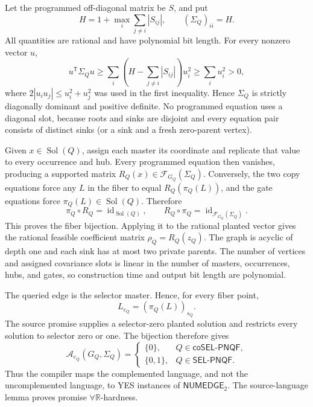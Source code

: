 Let the programmed off-diagonal matrix be \(S\), and put
\[
H=1+\max_i\sum_{j\ne i}|S_{ij}|,
\qquad (\Sigma_Q)_{ii}=H.
\]
All quantities are rational and have polynomial bit length.  For every nonzero vector \(u\),
\[
u^{\mathsf T}\Sigma_Q u
\ge \sum_i\left(H-\sum_{j\ne i}|S_{ij}|\right)u_i^2
\ge \sum_i u_i^2>0,
\]
where \(2|u_i u_j|\le u_i^2+u_j^2\) was used in the first inequality.  Hence \(\Sigma_Q\) is strictly diagonally dominant and positive definite.  No programmed equation uses a diagonal slot, because roots and sinks are disjoint and every equation pair consists of distinct sinks (or a sink and a fresh zero-parent vertex).

Given \(x\in\operatorname{Sol}(Q)\), assign each master its coordinate and replicate that value to every occurrence and hub.  Every programmed equation then vanishes, producing a supported matrix \(R_Q(x)\in\mathcal F_{G_Q}(\Sigma_Q)\).  Conversely, the two copy equations force any \(L\) in the fiber to equal \(R_Q(\pi_Q(L))\), and the gate equations force \(\pi_Q(L)\in\operatorname{Sol}(Q)\).  Therefore
\[
\pi_Q\circ R_Q=\operatorname{id}_{\operatorname{Sol}(Q)},
\qquad
R_Q\circ\pi_Q=\operatorname{id}_{\mathcal F_{G_Q}(\Sigma_Q)}.
\]
This proves the fiber bijection.  Applying it to the rational planted vector gives the rational feasible coefficient matrix \(\rho_Q=R_Q(z_Q)\).  The graph is acyclic of depth one and each sink has at most two private parents.  The number of vertices and assigned covariance slots is linear in the number of masters, occurrences, hubs, and gates, so construction time and output bit length are polynomial.

The queried edge is the selector master.  Hence, for every fiber point,
\[
L_{e_Q}=(\pi_Q(L))_{s_Q}.
\]
The source promise supplies a selector-zero planted solution and restricts every solution to selector zero or one.  The bijection therefore gives
\[
\mathcal A_{e_Q}(G_Q,\Sigma_Q)
=\begin{cases}
\{0\},&Q\in\mathsf{coSEL\mbox{-}PNQF},\\
\{0,1\},&Q\in\mathsf{SEL\mbox{-}PNQF}.
\end{cases}
\]
Thus the compiler maps the complemented language, and not the uncomplemented language, to YES instances of \(\mathsf{NUMEDGE}_2\).  The source-language lemma proves promise \(\forall\mathbb R\)-hardness.

